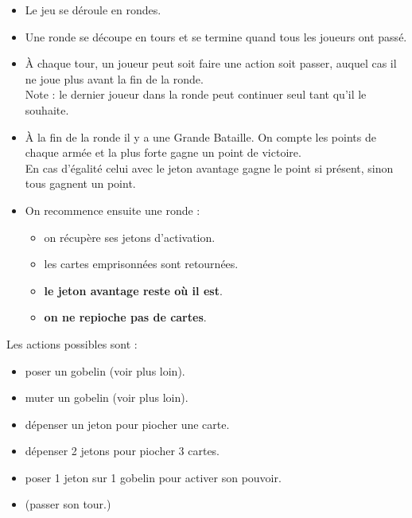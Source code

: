 \documentclass[10pt, a4paper]{article}	%
\begin{document}
\begin{multicols}{3}
\begin{itemize}
\item Le jeu se déroule en rondes.
\item Une ronde se découpe en tours et se termine quand tous les joueurs ont passé.
\item À chaque tour, un joueur peut soit faire une action soit passer, auquel cas il ne joue plus avant la fin de la ronde.
\\Note : le dernier joueur dans la ronde peut continuer seul tant qu'il le souhaite.
\item À la fin de la ronde il y a une Grande Bataille. On compte les points de chaque armée et la plus forte gagne un point de victoire.
\\En cas d'égalité celui avec le jeton avantage gagne le point si présent, sinon tous gagnent un point.
\item On recommence ensuite une ronde :
	\begin{itemize}
	\item on récupère ses jetons d'activation.
	\item les cartes emprisonnées sont retournées.
	\item \textbf{le jeton avantage reste où il est}.
	\item \textbf{on ne repioche pas de cartes}.
	\end{itemize}
\end{itemize}

\vspace{0.2cm}
Les actions possibles sont :
\begin{itemize}
\item poser un gobelin (voir plus loin).
\item muter un gobelin (voir plus loin).
\item dépenser un jeton pour piocher une carte.
\item dépenser 2 jetons pour piocher 3 cartes.
\item poser 1 jeton sur 1 gobelin pour activer son pouvoir.
\item (passer son tour.)
\end{itemize}


\end{multicols}
\end{document}
